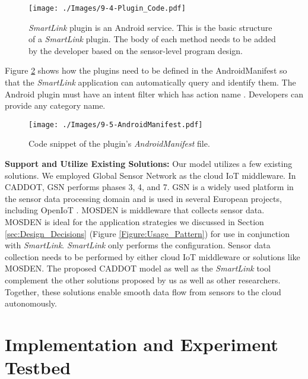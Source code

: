 \documentclass[graybox]{svmult}
\begin{document}
\begin{figure}[h]
 \centering
\texttt{[image: ./Images/9-4-Plugin\_Code.pdf]}
\caption{\textit{SmartLink} plugin is an Android service. This is the basic structure of a \textit{SmartLink} plugin. The body of each method needs to be added by the developer based on the sensor-level program design.}
 \label{Figure:Plugin_Code}	
\end{figure}

Figure \ref{Figure:AndroidManifest} shows how the plugins need to be defined in the AndroidManifest so that the \textit{SmartLink} application can automatically query and identify them. The Android plugin must have an intent filter which has action name  \textit{}. Developers can provide any category name.



\begin{figure}[h]
 \centering
\texttt{[image: ./Images/9-5-AndroidManifest.pdf]}
\caption{Code snippet of the plugin's \textit{AndroidManifest} file.}
 \label{Figure:AndroidManifest}	
\vspace{-0.23cm}	
\end{figure}




\textbf{Support and Utilize Existing Solutions:} Our model utilizes a few existing solutions. We employed Global Sensor Network  \cite{P022} as the cloud IoT middleware. In CADDOT, GSN performs phases 3, 4, and 7. GSN is a widely used platform in the sensor data processing domain and is used in several European projects, including OpenIoT \cite{P377}. MOSDEN \cite{ZMP009} is middleware that collects sensor data. MOSDEN is ideal for the application strategies we discussed in Section \ref{sec:Design_Decisions} (Figure \ref{Figure:Usage_Pattern}) for use in conjunction with \textit{SmartLink}. \textit{SmartLink} only performs the configuration. Sensor data collection needs to be performed by either cloud IoT middleware or solutions like MOSDEN. The proposed CADDOT model as well as the \textit{SmartLink} tool complement the other solutions proposed by us as well as other researchers. Together, these solutions enable smooth data flow from sensors to the cloud autonomously.





\section{Implementation and Experiment Testbed}
\label{sec:Implementation}
\end{document}
